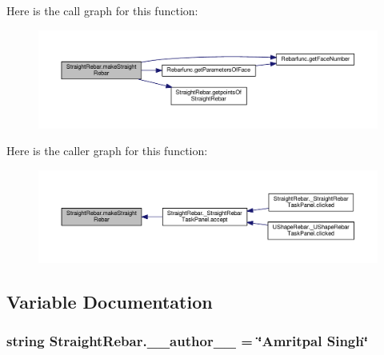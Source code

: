 Here is the call graph for this function\+:\nopagebreak
\begin{figure}[H]
\begin{center}
\leavevmode
\includegraphics[width=350pt]{namespaceStraightRebar_af6270367d7beae457813e33718d80faf_cgraph}
\end{center}
\end{figure}




Here is the caller graph for this function\+:\nopagebreak
\begin{figure}[H]
\begin{center}
\leavevmode
\includegraphics[width=350pt]{namespaceStraightRebar_af6270367d7beae457813e33718d80faf_icgraph}
\end{center}
\end{figure}




\subsection{Variable Documentation}
\subsubsection[{\texorpdfstring{\+\_\+\+\_\+author\+\_\+\+\_\+}{__author__}}]{\setlength{\rightskip}{0pt plus 5cm}string Straight\+Rebar.\+\_\+\+\_\+author\+\_\+\+\_\+ = \char`\"{}Amritpal Singh\char`\"{}\hspace{0.3cm}{\ttfamily [private]}}\hypertarget{namespaceStraightRebar_ad355d40e3bea5e86c24b6fe813264413}{}\label{namespaceStraightRebar_ad355d40e3bea5e86c24b6fe813264413}


